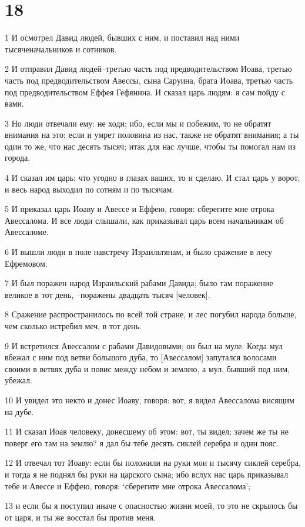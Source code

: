 \chapter{18}

\par 1 И осмотрел Давид людей, бывших с ним, и поставил над ними тысяченачальников и сотников.
\par 2 И отправил Давид людей--третью часть под предводительством Иоава, третью часть под предводительством Авессы, сына Саруина, брата Иоава, третью часть под предводительством Еффея Гефянина. И сказал царь людям: я сам пойду с вами.
\par 3 Но люди отвечали ему: не ходи; ибо, если мы и побежим, то не обратят внимания на это; если и умрет половина из нас, также не обратят внимания; а ты один то же, что нас десять тысяч; итак для нас лучше, чтобы ты помогал нам из города.
\par 4 И сказал им царь: что угодно в глазах ваших, то и сделаю. И стал царь у ворот, и весь народ выходил по сотням и по тысячам.
\par 5 И приказал царь Иоаву и Авессе и Еффею, говоря: сберегите мне отрока Авессалома. И все люди слышали, как приказывал царь всем начальникам об Авессаломе.
\par 6 И вышли люди в поле навстречу Израильтянам, и было сражение в лесу Ефремовом.
\par 7 И был поражен народ Израильский рабами Давида; было там поражение великое в тот день, --поражены двадцать тысяч [человек].
\par 8 Сражение распространилось по всей той стране, и лес погубил народа больше, чем сколько истребил меч, в тот день.
\par 9 И встретился Авессалом с рабами Давидовыми; он был на муле. Когда мул вбежал с ним под ветви большого дуба, то [Авессалом] запутался волосами своими в ветвях дуба и повис между небом и землею, а мул, бывший под ним, убежал.
\par 10 И увидел это некто и донес Иоаву, говоря: вот, я видел Авессалома висящим на дубе.
\par 11 И сказал Иоав человеку, донесшему об этом: вот, ты видел; зачем же ты не поверг его там на землю? я дал бы тебе десять сиклей серебра и один пояс.
\par 12 И отвечал тот Иоаву: если бы положили на руки мои и тысячу сиклей серебра, и тогда я не поднял бы руки на царского сына; ибо вслух нас царь приказывал тебе и Авессе и Еффею, говоря: `сберегите мне отрока Авессалома';
\par 13 и если бы я поступил иначе с опасностью жизни моей, то это не скрылось бы от царя, и ты же восстал бы против меня.
